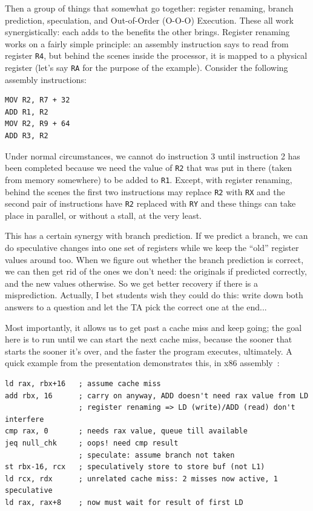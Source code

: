 \documentclass[a4paper]{report}
\begin{document}
Then a group of things that somewhat go together: register renaming, branch prediction, speculation, and Out-of-Order (O-O-O) Execution. These all work synergistically: each adds to the benefits the other brings. Register renaming works on a fairly simple principle: an assembly instruction says to read from register \texttt{R4}, but behind the scenes inside the processor, it is mapped to a physical register (let's say \texttt{RA} for the purpose of the example). Consider the following assembly instructions:

\begin{verbatim}
MOV R2, R7 + 32
ADD R1, R2
MOV R2, R9 + 64
ADD R3, R2
\end{verbatim}

Under normal circumstances, we cannot do instruction 3 until instruction 2 has been completed because we need the value of \texttt{R2} that was put in there (taken from memory somewhere) to be added to \texttt{R1}. Except, with register renaming, behind the scenes the first two instructions may replace \texttt{R2} with \texttt{RX} and the second pair of instructions have \texttt{R2} replaced with \texttt{RY} and these things can take place in parallel, or without a stall, at the very least.

This has a certain synergy with branch prediction. If we predict a branch, we can do speculative changes into one set of registers while we keep the ``old'' register values around too. When we figure out whether the branch prediction is correct, we can then get rid of the ones we don't need: the originals if predicted correctly, and the new values otherwise. So we get better recovery if there is a misprediction. Actually, I bet students wish they could do this: write down both answers to a question and let the TA pick the correct one at the end...

Most importantly, it allows us to get past a cache miss and keep going; the goal here is to run until we can start the next cache miss, because the sooner that starts the sooner it's over, and the faster the program executes, ultimately. A quick example from the presentation demonstrates this, in x86 assembly~\cite{modern-hardware}:

\begin{verbatim}
ld rax, rbx+16   ; assume cache miss
add rbx, 16      ; carry on anyway, ADD doesn't need rax value from LD
                 ; register renaming => LD (write)/ADD (read) don't interfere
cmp rax, 0       ; needs rax value, queue till available
jeq null_chk     ; oops! need cmp result
                 ; speculate: assume branch not taken
st rbx-16, rcx   ; speculatively store to store buf (not L1)
ld rcx, rdx      ; unrelated cache miss: 2 misses now active, 1 speculative
ld rax, rax+8    ; now must wait for result of first LD
\end{verbatim}
\end{document}
